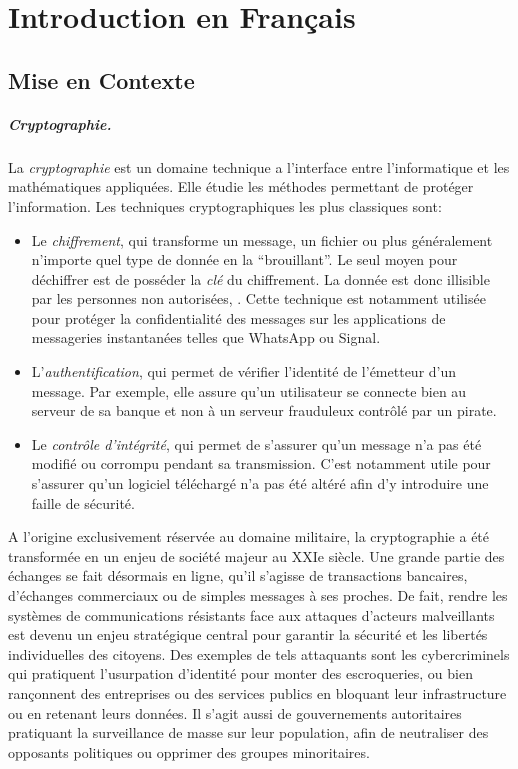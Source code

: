
\chapter*{Introduction en Français}


\section{Mise en Contexte}

\paragraph{Cryptographie.} La \textit{cryptographie} est un domaine technique a l'interface entre l'informatique et les mathématiques appliquées. Elle étudie les méthodes permettant de protéger l'information. Les techniques cryptographiques les plus classiques sont:
\begin{itemize}
	\item Le \textit{chiffrement}, qui transforme un message, un fichier ou plus généralement n'importe quel type de donnée en la ``brouillant''. Le seul moyen pour déchiffrer est de posséder la \textit{clé} du chiffrement. La donnée est donc illisible par les personnes non autorisées, . Cette technique est notamment utilisée pour protéger la confidentialité des messages sur les applications de messageries instantanées telles que WhatsApp ou Signal.
	\item L'\textit{authentification}, qui permet de vérifier l'identité de l'émetteur d'un message. Par exemple, elle assure qu’un utilisateur se connecte bien au serveur de sa banque et non à un serveur frauduleux contrôlé par un pirate.
	\item Le \textit{contrôle d'intégrité}, qui permet de s'assurer qu'un message n'a pas été modifié ou corrompu pendant sa transmission. C'est notamment utile pour s'assurer qu'un logiciel téléchargé n'a pas été altéré afin d'y introduire une faille de sécurité.
\end{itemize}


A l'origine exclusivement réservée au domaine militaire, la cryptographie a été transformée en un enjeu de société majeur au XXIe siècle. Une grande partie des échanges se fait désormais en ligne, qu'il s'agisse de transactions bancaires, d'échanges commerciaux ou de simples messages à ses proches. De fait, rendre les systèmes de communications résistants face aux attaques d'acteurs malveillants est devenu  un enjeu stratégique central pour garantir la sécurité et les libertés individuelles des citoyens. Des exemples de tels attaquants sont les cybercriminels qui pratiquent l'usurpation d'identité pour monter des escroqueries, ou bien rançonnent des entreprises ou des services publics en bloquant leur infrastructure ou en retenant leurs données. Il s'agit aussi de gouvernements autoritaires pratiquant la surveillance de masse sur leur population, afin de neutraliser des opposants politiques ou opprimer des groupes minoritaires.

